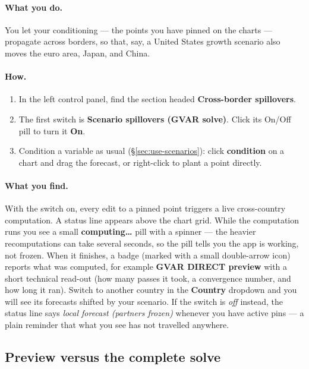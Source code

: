 \documentclass[11pt]{article}
\theoremstyle{definition}
\theoremstyle{remark}
\begin{document}
\paragraph{What you do.} You let your conditioning --- the points you have pinned
on the charts --- propagate across borders, so that, say, a United States growth
scenario also moves the euro area, Japan, and China.

\paragraph{How.}
\begin{enumerate}
  \item In the left control panel, find the section headed
    \textbf{Cross-border spillovers}.
  \item The first switch is \textbf{Scenario spillovers (GVAR solve)}. Click its
    On/Off pill to turn it \textbf{On}.
  \item Condition a variable as usual (\S\ref{sec:use-scenarios}): click
    \textbf{condition} on a chart and drag the forecast, or right-click to plant
    a point directly.
\end{enumerate}

\paragraph{What you find.} With the switch on, every edit to a pinned point
triggers a live cross-country computation. A status line appears above the chart
grid. While the computation runs you see a small \textbf{computing\ldots} pill
with a spinner --- the heavier recomputations can take several seconds, so the
pill tells you the app is working, not frozen. When it finishes, a badge
(marked with a small double-arrow icon) reports what was computed, for example
\textbf{GVAR DIRECT preview} with a short technical read-out (how many passes it
took, a convergence number, and how long it ran). Switch to another country in
the \textbf{Country} dropdown and you will see its forecasts shifted by your
scenario. If the switch is \emph{off} instead, the status line says \emph{local
forecast (partners frozen)} whenever you have active pins --- a plain reminder
that what you see has not travelled anywhere.

\subsection{Preview versus the complete solve}
\end{document}

